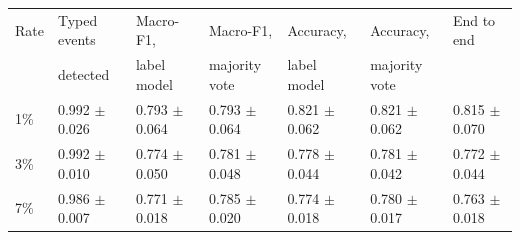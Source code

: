 \documentclass[11pt,a4paper]{article}
\makeatletter
\newenvironment{stable}{\par\addvspace{8pt}\noindent\begin{minipage}{\textwidth}\def\@captype{table}\centering}{\end{minipage}\par\addvspace{8pt}}
\makeatother
\begin{document}
\begin{stable}
\caption{Transfer to Tetouan: attribution by the frozen label model (one E-step with the parameters fitted on the Moroccan votes) and by the rules' majority vote, mean $\pm$ s.d. over the 10 seeds. End to end: the share of typed injected events both detected and correctly typed.}\label{tab:s-tetouan-attr}
\scriptsize\setlength{\tabcolsep}{4pt}
\begin{tabular}{@{}l l l l l l l@{}}
\toprule
Rate & Typed events & Macro-F1, & Macro-F1, & Accuracy, & Accuracy, & End to end \\
 & detected & label model & majority vote & label model & majority vote & \\
\midrule
1\% & 0.992 $\pm$ 0.026 & 0.793 $\pm$ 0.064 & 0.793 $\pm$ 0.064 & 0.821 $\pm$ 0.062 & 0.821 $\pm$ 0.062 & 0.815 $\pm$ 0.070 \\
3\% & 0.992 $\pm$ 0.010 & 0.774 $\pm$ 0.050 & 0.781 $\pm$ 0.048 & 0.778 $\pm$ 0.044 & 0.781 $\pm$ 0.042 & 0.772 $\pm$ 0.044 \\
7\% & 0.986 $\pm$ 0.007 & 0.771 $\pm$ 0.018 & 0.785 $\pm$ 0.020 & 0.774 $\pm$ 0.018 & 0.780 $\pm$ 0.017 & 0.763 $\pm$ 0.018 \\
\bottomrule
\end{tabular}
\end{stable}
\end{document}

